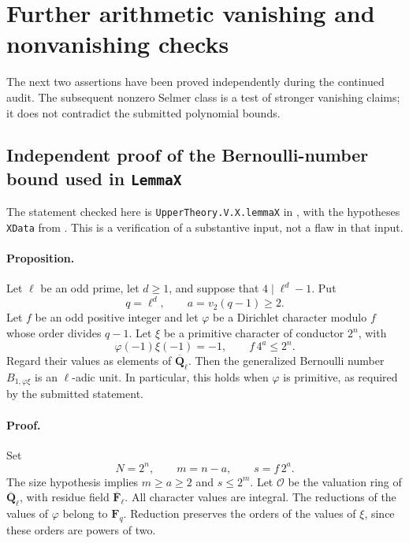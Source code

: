 \documentclass[11pt,a4paper]{article}
\theoremstyle{remark}
\begin{document}
\section{Further arithmetic vanishing and nonvanishing checks}\label{sec:further-arithmetic}
The next two assertions have been proved independently during the continued audit. The subsequent nonzero Selmer class is a test of stronger vanishing claims; it does not contradict the submitted polynomial bounds.

\subsection{Independent proof of the Bernoulli-number bound used in \texttt{LemmaX}}

The statement checked here is
\texttt{UpperTheory.V.X.lemmaX} in
, with the hypotheses
\texttt{XData} from
.
This is a verification of a substantive input, not a flaw in that input.

\paragraph{Proposition.}
Let $\ell$ be an odd prime, let $d\geq1$, and suppose that
$4\mid\ell^d-1$.  Put
\[
 q=\ell^d,\qquad a=v_2(q-1)\geq2.
\]
Let $f$ be an odd positive integer and let $\varphi$ be a Dirichlet
character modulo $f$ whose order divides $q-1$.  Let $\xi$ be a
primitive character of conductor $2^n$, with
\[
 \varphi(-1)\xi(-1)=-1,
 \qquad f\,4^a\leq2^n.
\]
Regard their values as elements of $\overline{\mathbf Q}_\ell$.
Then the generalized Bernoulli number $B_{1,\varphi\xi}$ is an
$\ell$-adic unit.  In particular, this holds when $\varphi$ is
primitive, as required by the submitted statement.

\paragraph{Proof.}
Set
\[
 N=2^n,\qquad m=n-a,\qquad s=f\,2^a.
\]
The size hypothesis implies $m\geq a\geq2$ and $s\leq2^m$.
Let $\mathcal O$ be the valuation ring of
$\overline{\mathbf Q}_\ell$, with residue field
$\overline{\mathbf F}_\ell$.  All character values are integral.
The reductions of the values of $\varphi$ belong to $\mathbf F_q$.
Reduction preserves the orders of the values of $\xi$, since these
orders are powers of two.
\end{document}
